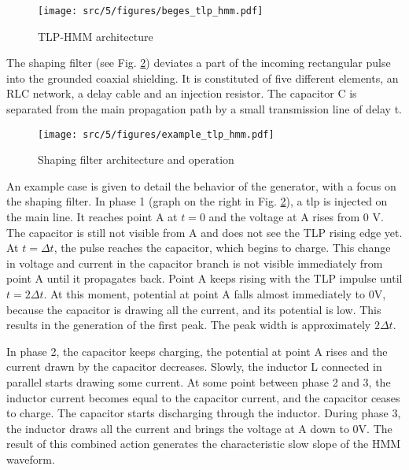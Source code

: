 \begin{figure}[!h]
  \centering
  \texttt{[image: src/5/figures/beges\_tlp\_hmm.pdf]}
  \caption{TLP-HMM architecture}
  \label{fig:tlp_hmm_architecture}
\end{figure}


The shaping filter (see Fig. \ref{fig:shaping_filter_example}) deviates a part of the incoming rectangular pulse into the grounded coaxial shielding.
It is constituted of five different elements, an RLC network, a delay cable and an injection resistor.
The capacitor C is separated from the main propagation path by a small transmission line of delay \textDelta{}t.


\begin{figure}[!h]
  \centering
  \texttt{[image: src/5/figures/example\_tlp\_hmm.pdf]}
  \caption{Shaping filter architecture and operation}
  \label{fig:shaping_filter_example}
\end{figure}

An example case is given to detail the behavior of the generator, with a focus on the shaping filter.
In phase 1 (graph on the right in Fig. \ref{fig:shaping_filter_example}), a \gls{tlp} is injected on the main line.
It reaches point A at $t=0$ and the voltage at A rises from 0 V.
The capacitor is still not visible from A and does not see the TLP rising edge yet.
At $t=\Delta t$, the pulse reaches the capacitor, which begins to charge.
This change in voltage and current in the capacitor branch is not visible immediately from point A until it propagates back.
Point A keeps rising with the TLP impulse until $t=2\Delta t$.
At this moment, potential at point A falls almost immediately to 0V, because the capacitor is drawing all the current, and its potential is low.
This results in the generation of the first peak.
The peak width is approximately $2\Delta t$.

In phase 2, the capacitor keeps charging, the potential at point A rises and the current drawn by the capacitor decreases.
Slowly, the inductor L connected in parallel starts drawing some current.
At some point between phase 2 and 3, the inductor current becomes equal to the capacitor current, and the capacitor ceases to charge.
The capacitor starts discharging through the inductor.
During phase 3, the inductor draws all the current and brings the voltage at A down to 0V.
The result of this combined action generates the characteristic slow slope of the HMM waveform.

